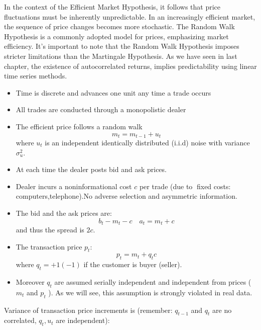 In the context of the Efficient Market Hypothesis, it follows that price fluctuations must be inherently unpredictable. In an increasingly efficient market, the sequence of price changes becomes more stochastic. The Random Walk Hypothesis is a commonly adopted model for prices, emphasizing market efficiency. It's important to note that the Random Walk Hypothesis imposes stricter limitations than the Martingale Hypothesis.
As we have seen in last chapter, the existence of autocorrelated returns, implies predictability using linear time series methods.
\begin{mysetting}
\begin{itemize}
	\item Time is discrete and advances one unit any time a trade occurs
	\item All trades are conducted through a monopolistic dealer
	\item The efficient price follows a random walk
	\begin{equation}
	m_t = m_{t-1} + u_t
	\label{efficient_price_random}
	\end{equation}
	where $u_t$ is an independent identically distributed (i.i.d) noise with variance $\sigma^2_u$.
	\item At each time the dealer posts bid and ask prices.
	\item Dealer incurs a noninformational cost $c$ per trade (due to fixed costs: computers,telephone).No adverse selection and asymmetric information.
	\item The bid and the ask prices are:
	\[
	b_t - m_t -c \quad a_t = m_t + c
	\]
	and thus the spread is $2c$.
	\item The transaction price $p_t$:
	\begin{equation}
	p_t = m_t + q_tc
	\label{transaction_price}
	\end{equation}
where $q_t = +1(-1)$ if the customer is buyer (seller).
\end{itemize}
\end{mysetting}
\begin{mysetting}
	\begin{itemize}
\item Moreover $q_t$ are assumed serially independent and independent from prices ($m_t$ and
$p_t$ ). As we will see, this assumption is strongly violated in real data.
\end{itemize}
\end{mysetting}
Variance of transaction price increments is (remember: $q_{t-1}$ and $q_t$ are no correlated, $q_t,u_t$ are independent):
